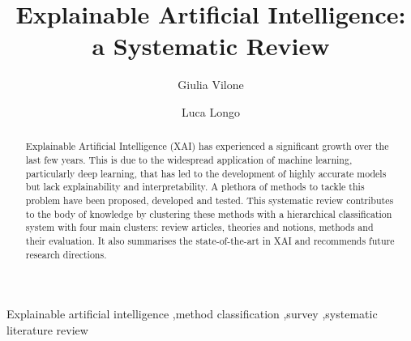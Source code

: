 \documentclass[final,1p,times]{elsarticle}
\begin{document}
\begin{frontmatter}



\title{Explainable Artificial Intelligence: a Systematic Review}



\author{Giulia Vilone}
\author{Luca Longo}

\address{School of Computer Science, College of Science and Health,\\ Technological University Dublin, Dublin, Republic of Ireland}

\begin{abstract}
Explainable Artificial Intelligence (XAI) has experienced a significant growth over the last few years. This is due to the widespread application of machine learning, particularly deep learning, that has led to the development of highly accurate models but lack explainability and interpretability. A plethora of methods to tackle this problem have been proposed, developed and tested. 
This systematic review contributes to the body of knowledge by clustering these methods with a hierarchical classification system with four main clusters: review articles, theories and notions, methods and their evaluation. It also summarises the state-of-the-art in XAI and recommends future research directions.

\end{abstract}


\begin{keyword}
Explainable artificial intelligence \sep method classification \sep survey \sep systematic literature review
\end{keyword}

\end{frontmatter}


\end{document}

